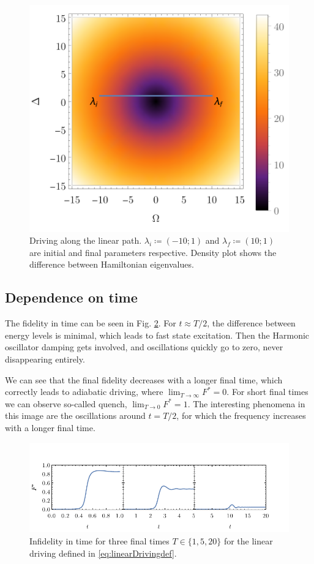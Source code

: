 \begin{figure}[h]
    \centering
    \includegraphics[scale=1.2]{../img/drivingLin.pdf}
    \caption{Driving along the linear path. $\lambda_i\coloneqq(-10;1)$ and $\lambda_f\coloneqq(10;1)$ are initial and final parameters respective. Density plot shows the difference between Hamiltonian eigenvalues.}
    \label{fig:driving1}
\end{figure}


\subsection{Dependence on time}
The fidelity in time can be seen in Fig. \ref{fig:infidelityTimePlotLin}. For $t\approx T/2$, the difference between energy levels is minimal, which leads to fast state excitation. Then the Harmonic oscillator damping gets involved, and oscillations quickly go to zero, never disappearing entirely.

We can see that the final fidelity decreases with a longer final time, which correctly leads to adiabatic driving, where $\lim_{T\rightarrow \infty} F^*=0$. For short final times we can observe so-called quench, $\lim_{T\rightarrow 0} F^*=1$. The interesting phenomena in this image are the oscillations around $t=T/2$, for which the frequency increases with a longer final time. 

\begin{figure}[h]
    \centering 
    \includegraphics[scale=1.185]{../img/infidelityInTimePlot1.pdf}
    \caption{Infidelity in time for three final times $T\in\{1,5,20\}$ for the linear driving defined in \ref{eq:linearDrivingdef}.}
  \label{fig:infidelityTimePlotLin}
\end{figure}


